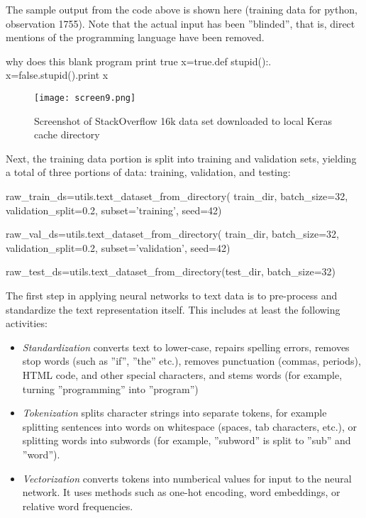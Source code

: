 The sample output from the code above is shown here (training data for python, observation 1755). Note that the actual input has been ''blinded'', that is, direct mentions of the programming language have been removed.

\begin{textcode}
why does this blank program print true x=true.def stupid():.
x=false.stupid().print x
\end{textcode}

\begin{figure}
\centering

\texttt{[image: screen9.png]}
\caption[StackOverflow dataset in Keras cache directory]{Screenshot of StackOverflow 16k data set downloaded to local Keras cache directory}
\label{fig:screen9_chap16}
\end{figure}

Next, the training data portion is split into training and validation sets, yielding a total of three portions of data: training, validation, and testing:

\begin{pythoncode}
raw_train_ds=utils.text_dataset_from_directory(
    train_dir, batch_size=32, validation_split=0.2,
    subset='training', seed=42)

raw_val_ds=utils.text_dataset_from_directory(
    train_dir, batch_size=32, validation_split=0.2,
    subset='validation', seed=42)

raw_test_ds=utils.text_dataset_from_directory(test_dir, batch_size=32)
\end{pythoncode}

The first step in applying neural networks to text data is to pre-process and standardize the text representation itself. This includes at least the following activities:

\begin{itemize}
   \item \emph{Standardization} converts text to lower-case, repairs spelling errors, removes stop words (such as ''if'', ''the'' etc.), removes punctuation (commas, periods), HTML code, and other special characters, and stems words (for example, turning ''programming'' into ''program'')
   \item \emph{Tokenization} splits character strings into separate tokens, for example splitting sentences into words on whitespace (spaces, tab characters, etc.), or splitting words into subwords (for example, ''subword'' is split to ''sub'' and ''word'').
   \item \emph{Vectorization} converts tokens into numberical values for input to the neural network. It uses methods such as one-hot encoding, word embeddings, or relative word frequencies.
\end{itemize}

